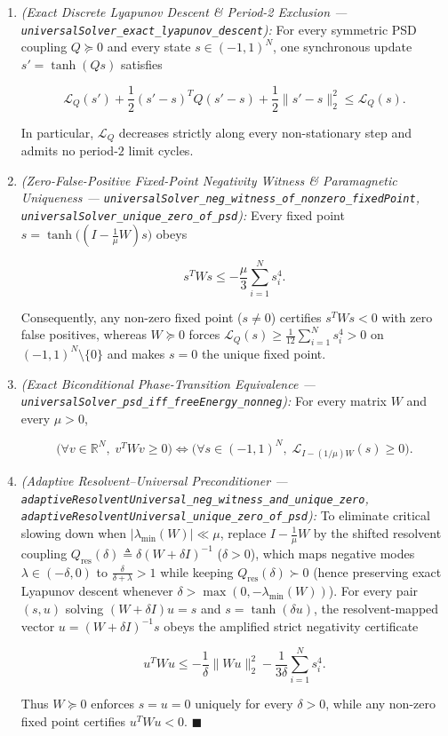\documentclass[
  11pt,
]{article}
\begin{document}
\begin{enumerate}
\def\labelenumi{\arabic{enumi}.}
\item
  \emph{(Exact Discrete Lyapunov Descent \& Period-2 Exclusion ---
  \texttt{universalSolver\_exact\_lyapunov\_descent}):} For every
  symmetric PSD coupling \(Q \succeq 0\) and every state
  \(s \in (-1, 1)^N\), one synchronous update \(s' = \tanh(Q s)\)
  satisfies

  \[\mathcal{L}_Q(s') + \frac{1}{2}(s' - s)^T Q(s' - s) + \frac{1}{2}\|s' - s\|_2^2 \le \mathcal{L}_Q(s).\]

  In particular, \(\mathcal{L}_Q\) decreases strictly along every
  non-stationary step and admits no period-\(2\) limit cycles.
\item
  \emph{(Zero-False-Positive Fixed-Point Negativity Witness \&
  Paramagnetic Uniqueness ---
  \texttt{universalSolver\_neg\_witness\_of\_nonzero\_fixedPoint},
  \texttt{universalSolver\_unique\_zero\_of\_psd}):} Every fixed point
  \(s = \tanh\big((I - \frac{1}{\mu}W)s\big)\) obeys

  \[s^T W s \le -\frac{\mu}{3}\sum_{i=1}^N s_i^4.\]

  Consequently, any non-zero fixed point (\(s \neq 0\)) certifies
  \(s^T W s < 0\) with zero false positives, whereas \(W \succeq 0\)
  forces \(\mathcal{L}_Q(s) \ge \frac{1}{12}\sum_{i=1}^N s_i^4 > 0\) on
  \((-1, 1)^N \setminus \{0\}\) and makes \(s = 0\) the unique fixed
  point.
\item
  \emph{(Exact Biconditional Phase-Transition Equivalence ---
  \texttt{universalSolver\_psd\_iff\_freeEnergy\_nonneg}):} For every
  matrix \(W\) and every \(\mu > 0\),

  \[\big(\forall v \in \mathbb{R}^N,\; v^T W v \ge 0\big) \iff \big(\forall s \in (-1, 1)^N,\; \mathcal{L}_{I - (1/\mu)W}(s) \ge 0\big).\]
\item
  \emph{(Adaptive Resolvent--Universal Preconditioner ---
  \texttt{adaptiveResolventUniversal\_neg\_witness\_and\_unique\_zero},
  \texttt{adaptiveResolventUniversal\_unique\_zero\_of\_psd}):} To
  eliminate critical slowing down when \(|\lambda_{\min}(W)| \ll \mu\),
  replace \(I - \frac{1}{\mu}W\) by the shifted resolvent coupling
  \(Q_{\text{res}}(\delta) \triangleq \delta(W + \delta I)^{-1}\)
  (\(\delta > 0\)), which maps negative modes
  \(\lambda \in (-\delta, 0)\) to
  \(\frac{\delta}{\delta + \lambda} > 1\) while keeping
  \(Q_{\text{res}}(\delta) \succ 0\) (hence preserving exact Lyapunov
  descent whenever \(\delta > \max(0, -\lambda_{\min}(W))\)). For every
  pair \((s, u)\) solving \((W + \delta I)u = s\) and
  \(s = \tanh(\delta u)\), the resolvent-mapped vector
  \(u = (W + \delta I)^{-1} s\) obeys the amplified strict negativity
  certificate

  \[u^T W u \le -\frac{1}{\delta}\|W u\|_2^2 - \frac{1}{3\delta}\sum_{i=1}^N s_i^4.\]

  Thus \(W \succeq 0\) enforces \(s = u = 0\) uniquely for every
  \(\delta > 0\), while any non-zero fixed point certifies
  \(u^T W u < 0\). \(\blacksquare\)
\end{enumerate}
\end{document}
